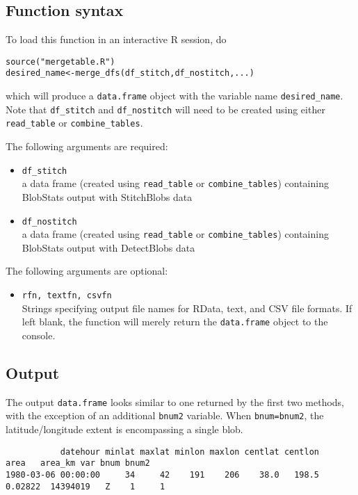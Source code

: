 \documentclass{article}
\begin{document}
\subsection{Function syntax}


To load this function in an interactive R session, do
\begin{verbatim}
source("mergetable.R")
desired_name<-merge_dfs(df_stitch,df_nostitch,...)
\end{verbatim}

which will produce a \texttt{data.frame} object with the variable name \texttt{desired\_name}. Note that \texttt{df\_stitch} and \texttt{df\_nostitch} will need to be created using either \texttt{read\_table} or \texttt{combine\_tables}.

The following arguments are required:
\begin{itemize}
\item[] \texttt{df\_stitch}\\ a data frame (created using \texttt{read\_table} or \texttt{combine\_tables}) containing BlobStats output with StitchBlobs data
\item[] \texttt{df\_nostitch}\\ a data frame (created using \texttt{read\_table} or \texttt{combine\_tables}) containing BlobStats output with DetectBlobs data
\end{itemize}

The following arguments are optional:
\begin{itemize}
\item[] \texttt{rfn, textfn, csvfn}\\Strings specifying output file names for RData, text, and CSV file formats. If left blank, the function will merely return the \texttt{data.frame} object to the console.
\end{itemize}

\subsection{Output}

The output \texttt{data.frame} looks similar to one returned by the first two methods, with the exception of an additional \texttt{bnum2} variable. When \texttt{bnum=bnum2}, the latitude/longitude extent is encompassing a single blob.

\begin{verbatim}
           datehour minlat maxlat minlon maxlon centlat centlon    area   area_km var bnum bnum2
1980-03-06 00:00:00     34     42    191    206    38.0   198.5 0.02822  14394019   Z    1     1
\end{verbatim}
\end{document}
